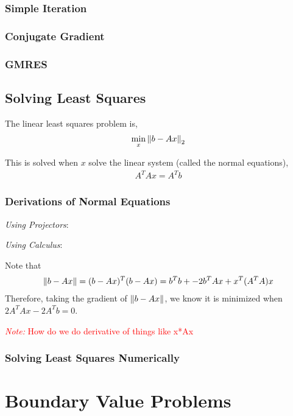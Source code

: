 \documentclass[12pt]{article}
\newcommand{\note}[1]{\textcolor{red}{\textit{Note:} #1}}
\begin{document}
\subsubsection{Simple Iteration}

\subsubsection{Conjugate Gradient}

\subsubsection{GMRES}


\subsection{Solving Least Squares}
The linear least squares problem is,
\begin{align*}
    \min_{x} \left\lVert b-Ax\right\rVert_2
\end{align*}

This is solved when \( x \) solve the linear system (called the normal equations),
\begin{align*}
    A^TAx = A^Tb
\end{align*}


\subsubsection{Derivations of Normal Equations}

\textit{Using Projectors}:


\textit{Using Calculus}:

Note that
\begin{align*}
    \left\lVert b-Ax\right\rVert = (b-Ax)^T(b-Ax) = b^Tb + -2b^TAx + x^T(A^TA)x
\end{align*}
Therefore, taking the gradient of \( \left\lVert b-Ax\right\rVert \), we know it is minimized when \( 2A^TAx - 2A^Tb = 0 \). 

\note{How do we do derivative of things like x*Ax }

\subsubsection{Solving Least Squares Numerically}

\pagebreak
\section{Boundary Value Problems}
\end{document}

